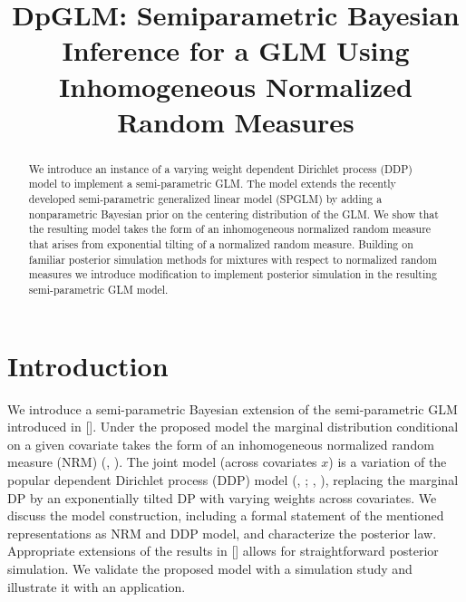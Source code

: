 \documentclass{article}[12pt]
\title{DpGLM: Semiparametric Bayesian Inference for a GLM Using Inhomogeneous Normalized Random Measures
}
\author{}
\date{}
\newcommand{\citeaa}[1]{\citeauthor{#1}, \href{cite.#1}{\textcolor{blue}{\citeyear{#1}}}}     %
\newcommand{\citeab}[1]{\citeauthor{#1} [\href{cite.#1}{\textcolor{blue}{\citeyear{#1}}}]}  %
\newcommand{\citeb}[2]{(\href{cite.#1}{\citeauthor{#1}}, \href{cite.#1}{\textcolor{blue} {\citeyear{#1}}}; \href{cite.#2}{\citeauthor{#2}}, \href{cite.#2}{\textcolor{blue} {\citeyear{#2}}})} %
\begin{document}
\maketitle

\begin{abstract}
  We introduce an instance of a varying weight dependent Dirichlet
process (DDP) model to implement a semi-parametric GLM.  The model
extends the recently developed semi-parametric generalized linear
model (SPGLM) by adding a nonparametric Bayesian prior on the
centering distribution of the GLM. We show that the resulting model
takes the form of an inhomogeneous normalized random measure that
arises from exponential tilting of a normalized random measure.
Building on familiar posterior simulation methods for mixtures with
respect to normalized random measures we introduce modification to
implement posterior simulation in the resulting semi-parametric GLM
model.
\end{abstract}
\section{Introduction}
We introduce a semi-parametric Bayesian extension of the
semi-parametric GLM introduced in
\citeab{rathouz2009generalized}. Under the proposed model the
marginal distribution conditional on a given covariate takes the form
of an inhomogeneous normalized random measure  (NRM)
(\citeaa{regazzini2003distributional}). The joint model (across covariates $x$) is a  variation of the popular dependent Dirichlet process (DDP) model
\citeb{maceachern;2000}{quintana2022dependent}, replacing the
marginal DP by an exponentially tilted DP with varying weights across
covariates. We discuss the model construction, including a formal
statement of the mentioned representations as NRM and DDP model, and
characterize the posterior law. Appropriate extensions of the results
in \citeab{james2009posterior} allows for straightforward posterior simulation. We validate the proposed model with a simulation study and illustrate it with an application. 

\end{document}
